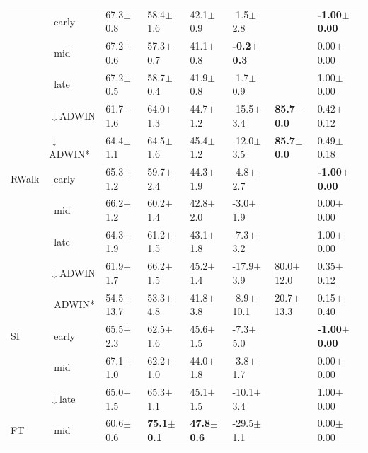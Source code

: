 \begin{tabular}{llllllll}
 & $\ \;$early & 67.3\tiny{$\pm$0.8} & 58.4\tiny{$\pm$1.6} & 42.1\tiny{$\pm$0.9} & -1.5\tiny{$\pm$2.8} &  & \textbf{-1.00\tiny{$\pm$0.00}} \\
 & $\ \;$mid & 67.2\tiny{$\pm$0.6} & 57.3\tiny{$\pm$0.7} & 41.1\tiny{$\pm$0.8} & \textbf{-0.2\tiny{$\pm$0.3}} &  & 0.00\tiny{$\pm$0.00} \\
 & $\ \;$late & 67.2\tiny{$\pm$0.5} & 58.7\tiny{$\pm$0.4} & 41.9\tiny{$\pm$0.8} & -1.7\tiny{$\pm$0.9} &  & 1.00\tiny{$\pm$0.00} \\
\midrule
\multirow[t]{5}{*}{RWalk} & $\downarrow$ADWIN & 61.7\tiny{$\pm$1.6} & 64.0\tiny{$\pm$1.3} & 44.7\tiny{$\pm$1.2} & -15.5\tiny{$\pm$3.4} & \textbf{85.7\tiny{$\pm$0.0}} & 0.42\tiny{$\pm$0.12} \\
 & $\downarrow$ADWIN* & 64.4\tiny{$\pm$1.1} & 64.5\tiny{$\pm$1.6} & 45.4\tiny{$\pm$1.2} & -12.0\tiny{$\pm$3.5} & \textbf{85.7\tiny{$\pm$0.0}} & 0.49\tiny{$\pm$0.18} \\
 & $\ \;$early & 65.3\tiny{$\pm$1.2} & 59.7\tiny{$\pm$2.4} & 44.3\tiny{$\pm$1.9} & -4.8\tiny{$\pm$2.7} &  & \textbf{-1.00\tiny{$\pm$0.00}} \\
 & $\ \;$mid & 66.2\tiny{$\pm$1.2} & 60.2\tiny{$\pm$1.4} & 42.8\tiny{$\pm$2.0} & -3.0\tiny{$\pm$1.9} &  & 0.00\tiny{$\pm$0.00} \\
 & $\ \;$late & 64.3\tiny{$\pm$1.9} & 61.2\tiny{$\pm$1.5} & 43.1\tiny{$\pm$1.8} & -7.3\tiny{$\pm$3.2} &  & 1.00\tiny{$\pm$0.00} \\
\midrule
\multirow[t]{5}{*}{SI} & $\downarrow$ADWIN & 61.9\tiny{$\pm$1.7} & 66.2\tiny{$\pm$1.5} & 45.2\tiny{$\pm$1.4} & -17.9\tiny{$\pm$3.9} & 80.0\tiny{$\pm$12.0} & 0.35\tiny{$\pm$0.12} \\
 & $\ \;$ADWIN* & 54.5\tiny{$\pm$13.7} & 53.3\tiny{$\pm$4.8} & 41.8\tiny{$\pm$3.8} & -8.9\tiny{$\pm$10.1} & 20.7\tiny{$\pm$13.3} & 0.15\tiny{$\pm$0.40} \\
 & $\ \;$early & 65.5\tiny{$\pm$2.3} & 62.5\tiny{$\pm$1.6} & 45.6\tiny{$\pm$1.5} & -7.3\tiny{$\pm$5.0} &  & \textbf{-1.00\tiny{$\pm$0.00}} \\
 & $\ \;$mid & 67.1\tiny{$\pm$1.0} & 62.2\tiny{$\pm$1.0} & 44.0\tiny{$\pm$1.8} & -3.8\tiny{$\pm$1.7} &  & 0.00\tiny{$\pm$0.00} \\
 & $\downarrow$late & 65.0\tiny{$\pm$1.5} & 65.3\tiny{$\pm$1.1} & 45.1\tiny{$\pm$1.5} & -10.1\tiny{$\pm$3.4} &  & 1.00\tiny{$\pm$0.00} \\
\midrule
FT & $\ \;$mid & 60.6\tiny{$\pm$0.6} & \textbf{75.1\tiny{$\pm$0.1}} & \textbf{47.8\tiny{$\pm$0.6}} & -29.5\tiny{$\pm$1.1} &  & 0.00\tiny{$\pm$0.00} \\
\bottomrule
\end{tabular}
